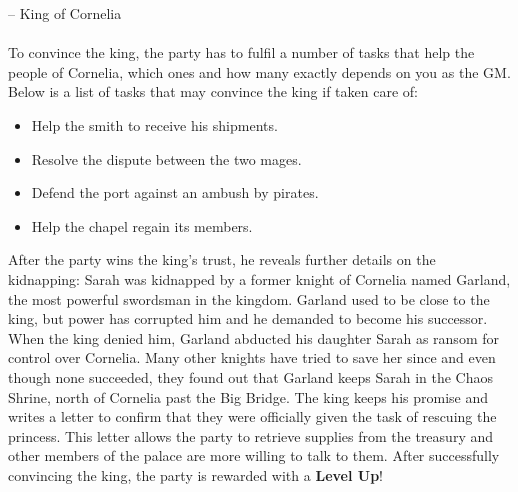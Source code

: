 \indent -- King of Cornelia \\\\
To convince the king, the party has to fulfil a number of tasks that help the people of Cornelia, which ones and how many exactly depends on you as the GM.
Below is a list of tasks that may convince the king if taken care of:
\begin{itemize}[leftmargin=*]
	\item Help the smith to receive his shipments.
	\item Resolve the dispute between the two mages.
	\item Defend the port against an ambush by pirates.
	\item Help the chapel regain its members.
\end{itemize}
After the party wins the king's trust, he reveals further details on the kidnapping:
Sarah was kidnapped by a former knight of Cornelia named Garland, the most powerful swordsman in the kingdom.
Garland used to be close to the king, but power has corrupted him and he demanded to become his successor. 
When the king denied him, Garland abducted his daughter Sarah as ransom for control over Cornelia.
Many other knights have tried to save her since and even though none succeeded, they found out that Garland keeps Sarah in the Chaos Shrine, north of Cornelia past the Big Bridge.
The king keeps his promise and writes a letter to confirm that they were officially given the task of rescuing the princess.
This letter allows the party to retrieve supplies from the treasury and other members of the palace are more willing to talk to them.
After successfully convincing the king, the party is rewarded with a \textbf{Level Up}!
\vspace{1.2cm}